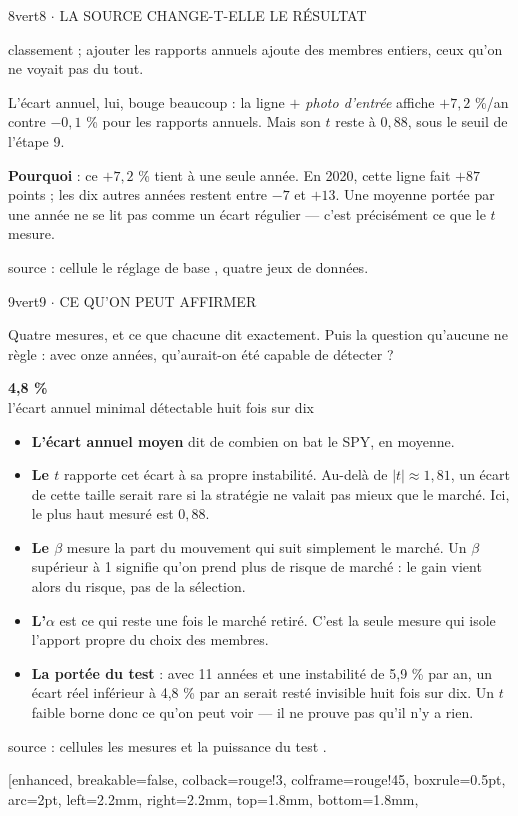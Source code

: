 \documentclass[10pt,a4paper]{article}
\newcommand{\reponse}[1]{{\footnotesize #1\par}\vspace{1.1mm}}
\newcommand{\phare}[3]{%
  \begin{center}\vspace{-0.6mm}
  {\Large\bfseries\color{#3} #1}\\[0.4mm]{\footnotesize #2}
  \end{center}\vspace{0.6mm}}
\newcommand{\pts}[1]{{\footnotesize\begin{itemize}#1\end{itemize}}\vspace{0.9mm}}
\newcommand{\src}[1]{{\scriptsize\color{grisf} #1\par}}
\newlength{\colw}\setlength{\colw}{0.4865\textwidth}
\newcommand{\rangee}[2]{%
  \noindent\begin{minipage}[t]{\colw}\vspace{0pt}#1\end{minipage}%
  \hfill\begin{minipage}[t]{\colw}\vspace{0pt}#2\end{minipage}\par}
\begin{document}
{\begin{etapebox}{8}{vert}{8 $\cdot$ LA SOURCE CHANGE-T-ELLE LE RÉSULTAT}
{classement ; ajouter les rapports annuels ajoute des membres entiers, ceux qu'on ne voyait pas du tout.
\item L'écart annuel, lui, bouge beaucoup : la ligne \emph{$+$ photo d'entrée} affiche $+7{,}2$ \%/an
contre $-0{,}1$ \% pour les rapports annuels. Mais son $t$ reste à $0{,}88$, sous le seuil de l'étape 9.
\item \textbf{Pourquoi} : ce $+7{,}2$ \% tient à une seule année. En 2020, cette ligne fait $+87$ points ;
les dix autres années restent entre $-7$ et $+13$. Une moyenne portée par une année ne se lit pas comme un
écart régulier --- c'est précisément ce que le $t$ mesure.
}
\src{source : cellule \og le réglage de base \fg{}, quatre jeux de données.}
\end{etapebox}}
\vfill
\vspace{3mm}
\rangee{\begin{etapebox}{9}{vert}{9 $\cdot$ CE QU'ON PEUT AFFIRMER}
\reponse{Quatre mesures, et ce que chacune dit exactement. Puis la question qu'aucune ne règle : avec onze
années, qu'aurait-on été capable de détecter ?}
\phare{4,8 \%}{l'écart annuel minimal détectable huit fois sur dix}{vert}
\pts{
\item \textbf{L'écart annuel moyen} dit de combien on bat le SPY, en moyenne.
\item \textbf{Le $t$} rapporte cet écart à sa propre instabilité. Au-delà de $|t| \approx 1{,}81$, un
écart de cette taille serait rare si la stratégie ne valait pas mieux que le marché. Ici, le plus haut
mesuré est $0{,}88$.
\item \textbf{Le $\beta$} mesure la part du mouvement qui suit simplement le marché. Un $\beta$ supérieur
à 1 signifie qu'on prend plus de risque de marché : le gain vient alors du risque, pas de la sélection.
\item \textbf{L'$\alpha$} est ce qui reste une fois le marché retiré. C'est la seule mesure qui isole
l'apport propre du choix des membres.
\item \textbf{La portée du test} : avec 11 années et une instabilité de 5,9 \% par an, un écart réel
inférieur à 4,8 \% par an serait resté invisible huit fois sur dix. Un $t$ faible borne donc ce qu'on peut
voir --- il ne prouve pas qu'il n'y a rien.
}
\src{source : cellules \og les mesures \fg{} et \og la puissance du test \fg{}.}
\end{etapebox}}{\begin{tcolorbox}[enhanced, breakable=false, colback=rouge!3, colframe=rouge!45, boxrule=0.5pt,
                  arc=2pt, left=2.2mm, right=2.2mm, top=1.8mm, bottom=1.8mm,

\end{tcolorbox}}
\end{document}
